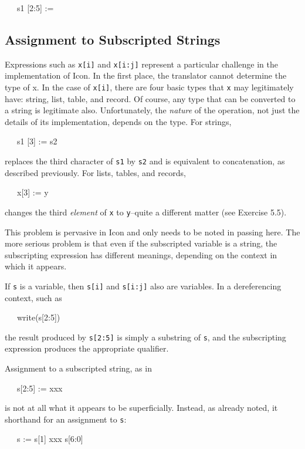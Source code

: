 \ \ \ s1 [2:5] := {\textquotedbl}{\textquotedbl}

\subsection{Assignment to Subscripted Strings}

Expressions such as \texttt{x[i]} and \texttt{x[i:j]} represent a
particular challenge in the implementation of Icon. In the first
place, the translator cannot determine the type of x. In the case of
\texttt{x[i]}, there are four basic types that \texttt{x} may
legitimately have: string, list, table, and record. Of course, any
type that can be converted to a string is legitimate
also. Unfortunately, the \textit{nature }of the operation, not just
the details of its implementation, depends on the type. For strings,

{\ttfamily\mdseries
\ \ \ s1 [3] := s2}

\noindent replaces the third character of \texttt{s1} by \texttt{s2}
and is equivalent to concatenation, as described previously.  For
lists, tables, and records,

{\ttfamily\mdseries
\ \ \ x[3] := y}

\noindent changes the third \textit{element }of \texttt{x} to
\texttt{y}{}--quite a different matter (see Exercise 5.5).

This problem is pervasive in Icon and only needs to be noted in
passing here. The more serious problem is that even if the subscripted
variable is a string, the subscripting expression has different
meanings, depending on the context in which it appears.

If \texttt{s} is a variable, then \texttt{s[i]} and \texttt{s[i:j]}
also are variables. In a dereferencing context, such as

{\ttfamily\mdseries
\ \ \ write(s[2:5])}

\noindent the result produced by \texttt{s[2:5]} is simply a substring
of \texttt{s}, and the subscripting expression produces the
appropriate qualifier.

Assignment to a subscripted string, as in

{\ttfamily\mdseries
\ \ \ s[2:5] := {\textquotedbl}xxx{\textquotedbl}}

\noindent is not at all what it appears to be superficially. Instead,
as already noted, it shorthand for an assignment to \texttt{s}:

{\ttfamily\mdseries
\ \ \ s := s[1] {\textbar}{\textbar} {\textquotedbl}xxx{\textquotedbl} {\textbar}{\textbar} s[6:0]}

